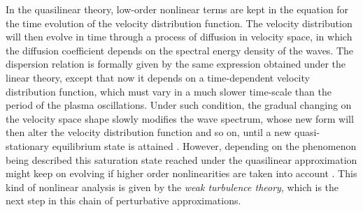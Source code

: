 \documentclass[12pt,a4paper,ruledheader]{report}
\begin{document}
In the quasilinear theory, low-order nonlinear terms are kept in
the equation for the time evolution of the velocity distribution
function. The velocity distribution will then evolve in time
through a process of diffusion in velocity space,
 in which the diffusion
coefficient depends on the spectral energy density of the waves.
The dispersion relation is formally given by the same expression
obtained under the linear theory, except that now it 
depends on a time-dependent velocity distribution function, 
which must vary in a much slower
time-scale than the period of the plasma oscillations. Under such
condition, the gradual changing on the velocity space shape slowly
modifies the wave spectrum, whose new form will then alter the
velocity distribution function and so on, until a new quasi-stationary
equilibrium state is attained \cite{gurnett2017}. However, depending
on the phenomenon being described this saturation state reached
under the quasilinear approximation might keep on evolving if higher
order nonlinearities are taken into account \cite{akhi2}. This kind
of nonlinear analysis is given by the \emph{weak turbulence theory},
which is the next step in this chain of perturbative approximations.
\end{document}
